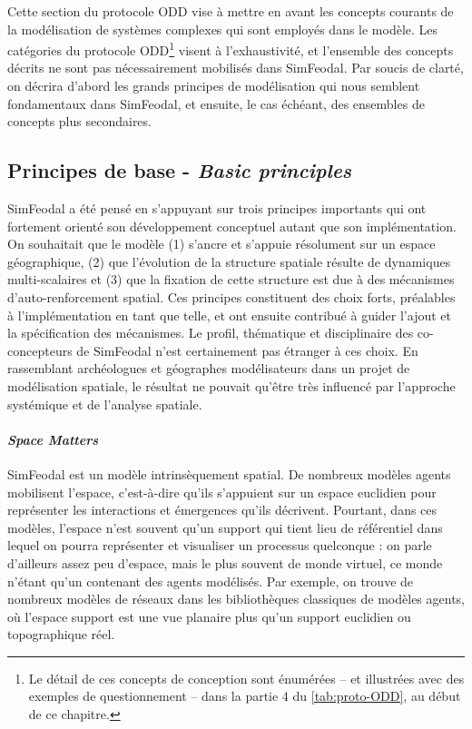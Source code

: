 Cette section du protocole ODD vise à mettre en avant les concepts courants de la modélisation de systèmes complexes qui sont employés dans le modèle.
Les catégories du protocole ODD\footnote{
		Le détail de ces \og concepts de conception\fg{} sont énumérées -- et illustrées avec des exemples de questionnement -- dans la partie 4 du \cref{tab:proto-ODD}, au début de ce chapitre.
} visent à l'exhaustivité, et l'ensemble des concepts décrits ne sont pas nécessairement mobilisés dans SimFeodal.
Par soucis de clarté, on décrira d'abord les grands principes de modélisation qui nous semblent fondamentaux dans SimFeodal, et ensuite, le cas échéant, des ensembles de concepts plus secondaires.

\subsection{Principes de base - \textit{Basic principles}}

SimFeodal a été pensé en s'appuyant sur trois principes importants qui ont fortement orienté son développement conceptuel autant que son implémentation. On souhaitait que le modèle (1) s'ancre et s'appuie résolument sur un espace géographique, (2) que l'évolution de la structure spatiale résulte de dynamiques multi-scalaires et (3) que la fixation de cette structure est due à des mécanismes d'auto-renforcement spatial.
Ces principes constituent des choix forts, préalables à l'implémentation en tant que telle, et ont ensuite contribué à guider l'ajout et la spécification des mécanismes.
Le profil, thématique et disciplinaire des co-concepteurs de SimFeodal n'est certainement pas étranger à ces choix.
En rassemblant archéologues et géographes modélisateurs dans un projet de modélisation spatiale, le résultat ne pouvait qu'être très influencé par l'approche systémique et de l'analyse spatiale.


\paragraph{\textit{Space Matters}}

SimFeodal est un modèle intrinsèquement spatial.
De nombreux modèles agents \og mobilisent\fg{} l'espace, c'est-à-dire qu'ils s'appuient sur un espace euclidien pour représenter les interactions et émergences qu'ils décrivent.
Pourtant, dans ces modèles, l'espace n'est souvent qu'un support qui tient lieu de référentiel dans lequel on pourra représenter et visualiser un processus quelconque : on parle d'ailleurs assez peu d'espace, mais le plus souvent de \og monde virtuel\fg{}, ce monde n'étant qu'un contenant des agents modélisés.
Par exemple, on trouve de nombreux modèles de réseaux dans les bibliothèques classiques de modèles agents, où l'espace support est une vue planaire plus qu'un support euclidien ou topographique réel.

